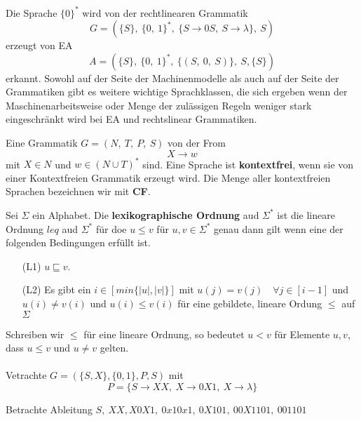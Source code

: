     Die Sprache \(\{0\}^*\) wird von der rechtlinearen Grammatik \[ G = (\{S\},\ \{0,\ 1\}^*,\ \{S \to 0S,\ S \to \lambda\},\ S)\] erzeugt von EA \[A = (\{S\},\ \{0,\ 1\}^*,\ \{(S,\ 0,\ S)\},\ S, \{S\})\] erkannt. Sowohl auf der Seite der Machinenmodelle als auch auf der Seite der Grammatiken gibt es weitere wichtige Sprachklassen, die sich ergeben wenn der Maschinenarbeitsweise oder Menge der zulässigen Regeln weniger stark eingeschränkt wird bei EA und rechtslinear Grammatiken.

    Eine Grammatik \(G = (N,\ T,\ P,\ S)\) von der From \[X \to w\] mit \(X \in N\) und \(w \in (N \cup T)^*\) sind. Eine Sprache ist \textbf{kontextfrei}, wenn sie von einer Kontextfreien Grammatik erzeugt wird. Die Menge aller kontextfreien Sprachen bezeichnen wir mit \textbf{CF}.

    Sei \(\Sigma \) ein Alphabet. Die \textbf{lexikographische Ordnung} aud \(\Sigma^*\) ist die lineare Ordnung \(leq\) aud \(\Sigma^*\) für doe \(u \leq v\) für \(u, v \in \Sigma^*\) genau dann gilt wenn eine der folgenden Bedingungen erfüllt ist.
    \begin{itemize}
        \item [(L1)] \( u \sqsubseteq v\).
        \item [(L2)] Es gibt ein \(i \in [min \{|u|, |v|\}] \) mit \( u(j) = v (j) \quad \forall j \in [i - 1]\) und \(u (i) \not = v (i)\) und \(u (i) \leq v(i)\) für eine gebildete, lineare Ordung \(\leq\) auf \(\Sigma\)
    \end{itemize}
    Schreiben wir \(\leq\) für eine lineare Ordnung, so bedeutet \(u < v\) für Elemente \(u, v\), dass \(u \leq v\) und \(u \not = v\) gelten.\\\\ Vetrachte \(G = (\{S, X\}, \{0, 1\}, P, S)\) mit \[P = \{S \to XX,\ X \to 0X1,\ X \to \lambda\}\] 
    
    \newpage
    Betrachte Ableitung \(S,\ XX, X0X1,\ 0x10x1,\ 0X101,\ 00X1101,\ 001101\)

